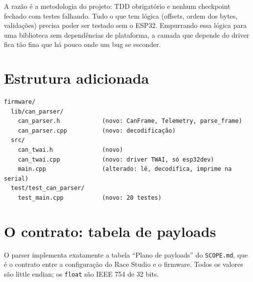 \documentclass[11pt,a4paper]{article}
\begin{document}
A razão é a metodologia do projeto: TDD obrigatório e nenhum checkpoint fechado com testes falhando. Tudo o que tem lógica (offsets, ordem dos bytes, validações) precisa poder ser testado sem o ESP32. Empurrando essa lógica para uma biblioteca sem dependências de plataforma, a camada que depende do driver fica tão fina que há pouco onde um bug se esconder.

\section{Estrutura adicionada}

\begin{lstlisting}[caption={Arquivos novos e alterados}]
firmware/
  lib/can_parser/
    can_parser.h            (novo: CanFrame, Telemetry, parse_frame)
    can_parser.cpp          (novo: decodificação)
  src/
    can_twai.h              (novo)
    can_twai.cpp            (novo: driver TWAI, só esp32dev)
    main.cpp                (alterado: lê, decodifica, imprime na serial)
  test/test_can_parser/
    test_main.cpp           (novo: 20 testes)
\end{lstlisting}

\section{O contrato: tabela de payloads}

O parser implementa exatamente a tabela ``Plano de payloads'' do \texttt{SCOPE.md}, que é o contrato entre a configuração do Race Studio e o firmware. Todos os valores são little endian; os \texttt{float} são IEEE 754 de 32 bits.
\end{document}
